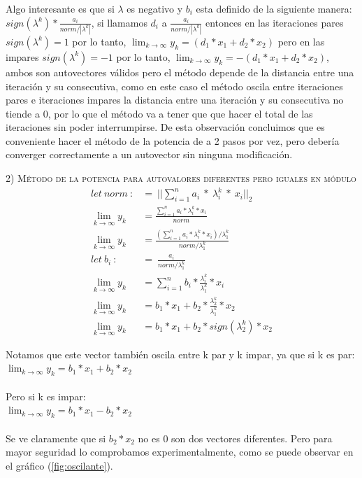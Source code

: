\vspace{1em}



Algo interesante es que si $\lambda$ es negativo y $b_i$ esta definido de la siguiente manera: $sign(\lambda^{k}) * \frac{a_i}{norm / |\lambda^{k}|}$, si llamamos $d_i$ a $\frac{a_i}{norm / |\lambda^{k}|}$ entonces en las iteraciones pares $sign(\lambda^{k}) = 1$ por lo tanto, $\lim_{k \to \infty} y_k = (d_1 * x_1 + d_2 * x_2)$ pero en las impares $sign(\lambda^{k}) = -1$ por lo tanto, $\lim_{k \to \infty} y_k = -(d_1 * x_1 + d_2 * x_2)$, ambos son autovectores válidos pero el método depende de la distancia entre una iteración y su consecutiva, como en este caso el método oscila entre iteraciones pares e iteraciones impares la distancia entre una iteración y su consecutiva no tiende a 0, por lo que el método va a tener que que hacer el total de las iteraciones sin poder interrumpirse. De esta observación concluimos que es conveniente hacer el método de la potencia de a 2 pasos por vez, pero debería converger correctamente a un autovector sin ninguna modificación.


\noindent \textsc{2) Método de la potencia para autovalores diferentes pero iguales en módulo}
\begin{align}
    let \ norm \ :&= \ ||\sum_{i=1}^{n} a_i \ * \ \lambda_{i}^{k} \ * \ x_i||_2 \\
    \lim_{k \to \infty} y_k &= \frac{\sum_{i=1}^{n} a_i * \lambda_{i}^{k} * x_i }{norm} \\ 
    \lim_{k \to \infty} y_k &= \frac{(\sum_{i=1}^{n} a_i * \lambda_{i}^{k} * x_i) / \lambda_{1}^{k}}{norm / \lambda_{1}^{k}} \\
    let \ b_i \ :&= \ \frac{a_i}{norm / \lambda_{1}^{k}} \\
    \lim_{k \to \infty} y_k &= \sum_{i=1}^{n} b_i * \frac{\lambda_{i}^{k}}{\lambda_{1}^{k}} * x_i \\
    \lim_{k \to \infty} y_k &= b_1 * x_1 + b_2 * \frac{\lambda_{2}^{k}}{\lambda_{1}^{k}} * x_2 \\
    \lim_{k \to \infty} y_k &= b_1 * x_1 + b_2 * sign(\lambda_{2}^{k}) * x_2 
\end{align}


\noindent Notamos que este vector también oscila entre k par y k impar, ya que si k es par: \\
\indent\indent $\lim_{k \to \infty} y_k = b_1 * x_1 + b_2 * x_2$ \\ \\
Pero si k es impar: \\
\indent \indent $\lim_{k \to \infty} y_k = b_1 * x_1 - b_2 * x_2$ \\ \\
Se ve claramente que si $b_2 * x_2$ no es 0 son dos vectores diferentes.
Pero para mayor seguridad lo comprobamos experimentalmente, como se puede observar en el gráfico (\ref{fig:oscilante}).

